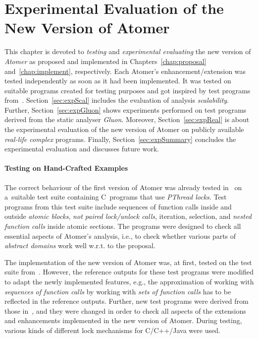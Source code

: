 


\chapter{Experimental Evaluation of the New Version of Atomer}
\label{chap:exp}

This chapter is devoted to \emph{testing} and \emph{experimental evaluating} the new version of \emph{Atomer} as proposed and implemented in Chapters~\ref{chap:proposal} and~\ref{chap:implement}, respectively. Each Atomer's enhancement/extension was tested independently as soon as it had been implemented. It was tested on suitable programs created for testing purposes and got inspired by test programs from~\cite{harmimBP}. Section~\ref{sec:expScal} includes the evaluation of analysis \emph{scalability}. Further, Section~\ref{sec:expGluon} shows experiments performed on test programs derived from the static analyser \emph{Gluon}. Moreover, Section~\ref{sec:expReal} is about the experimental evaluation of the new version of Atomer on publicly available \emph{real-life complex} programs. Finally, Section~\ref{sec:expSummary} concludes the experimental evaluation and discusses future work.

\subsubsection{Testing on Hand-Crafted Examples}

The correct behaviour of the first version of Atomer was already tested in~\cite{harmimBP} on a~suitable test suite containing C~programs that use \emph{PThread locks}. Test programs from this test suite include sequences of function calls inside and outside \emph{atomic blocks}, \emph{not paired lock/unlock calls}, iteration, selection, and \emph{nested function calls} inside atomic sections. The programs were designed to check all essential aspects of Atomer's analysis, i.e., to check whether various parts of \emph{abstract domains} work well w.r.t. to the proposal.

The implementation of the new version of Atomer was, at first, tested on the test suite from~\cite{harmimBP}. However, the reference outputs for these test programs were modified to adapt the newly implemented features, e.g., the approximation of working with \emph{sequences of function calls} by working with \emph{sets of function calls} has to be reflected in the reference outputs. Further, new test programs were derived from those in~\cite{harmimBP}, and they were changed in order to check all aspects of the extensions and enhancements implemented in the new version of Atomer. During testing, various kinds of different lock mechanisms for C/C++/Java were used.

